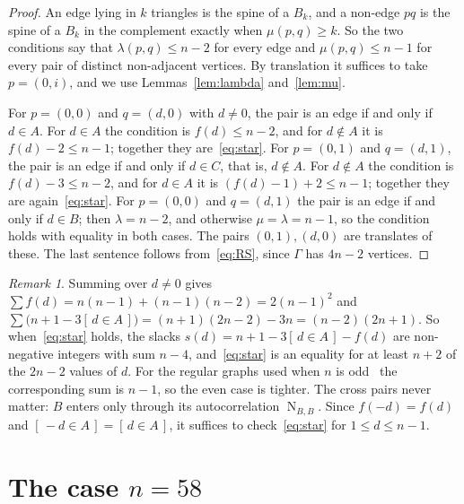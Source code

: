 \documentclass[11pt]{amsart}
\theoremstyle{definition}
\theoremstyle{remark}
\newtheorem{remark}[theorem]{Remark}
\numberwithin{equation}{section}
\newcommand{\NN}{\operatorname{N}}
\newcommand{\ind}[1]{[\,#1\,]}
\begin{document}
\begin{proof}
An edge lying in $k$ triangles is the spine of a $B_k$, and a non-edge $pq$ is the spine of a $B_k$ in the complement exactly when $\mu(p,q)\ge k$. So the two conditions say that $\lambda(p,q)\le n-2$ for every edge and $\mu(p,q)\le n-1$ for every pair of distinct non-adjacent vertices. By translation it suffices to take $p=(0,i)$, and we use Lemmas~\ref{lem:lambda} and~\ref{lem:mu}.

For $p=(0,0)$ and $q=(d,0)$ with $d\ne0$, the pair is an edge if and only if $d\in A$. For $d\in A$ the condition is $f(d)\le n-2$, and for $d\notin A$ it is $f(d)-2\le n-1$; together they are~\eqref{eq:star}. For $p=(0,1)$ and $q=(d,1)$, the pair is an edge if and only if $d\in C$, that is, $d\notin A$. For $d\notin A$ the condition is $f(d)-3\le n-2$, and for $d\in A$ it is $(f(d)-1)+2\le n-1$; together they are again~\eqref{eq:star}. For $p=(0,0)$ and $q=(d,1)$ the pair is an edge if and only if $d\in B$; then $\lambda=n-2$, and otherwise $\mu=\lambda=n-1$, so the condition holds with equality in both cases. The pairs $(0,1),(d,0)$ are translates of these. The last sentence follows from~\eqref{eq:RS}, since $\Gamma$ has $4n-2$ vertices.
\end{proof}

\begin{remark}\label{rem:slack}
Summing over $d\ne0$ gives $\sum f(d)=n(n-1)+(n-1)(n-2)=2(n-1)^2$ and $\sum\big(n+1-3\ind{d\in A}\big)=(n+1)(2n-2)-3n=(n-2)(2n+1)$. So when~\eqref{eq:star} holds, the slacks $s(d)=n+1-3\ind{d\in A}-f(d)$ are non-negative integers with sum $n-4$, and~\eqref{eq:star} is an equality for at least $n+2$ of the $2n-2$ values of $d$. For the regular graphs used when $n$ is odd~\cite{Bh,We} the corresponding sum is $n-1$, so the even case is tighter. The cross pairs never matter: $B$ enters only through its autocorrelation $\NN_{B,B}$. Since $f(-d)=f(d)$ and $\ind{-d\in A}=\ind{d\in A}$, it suffices to check~\eqref{eq:star} for $1\le d\le n-1$.
\end{remark}

\section{The case \texorpdfstring{$n=58$}{n = 58}}\label{sec:58}
\end{document}

